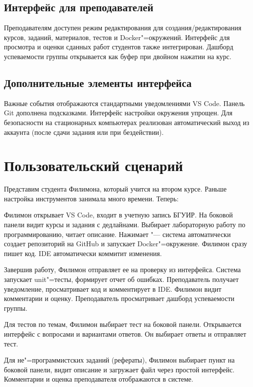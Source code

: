 \documentclass{bsuir}
\begin{document}
\subsection{Интерфейс для преподавателей}
Преподавателям доступен режим редактирования для создания/редактирования курсов,
заданий, материалов, тестов и Docker"=окружений. Интерфейс для просмотра и
оценки сданных работ студентов также интегрирован. Дашборд успеваемости группы
открывается как буфер при двойном нажатии на курс.

\subsection{Дополнительные элементы интерфейса}
Важные события отображаются стандартными уведомлениями VS Code. Панель Git
дополнена подсказками. Интерфейс настройки окружения упрощен. Для безопасности
на стационарных компьютерах реализован автоматический выход из аккаунта (после
сдачи задания или при бездействии).

\section{Пользовательский сценарий}

Представим студента Филимона, который учится на втором курсе. Раньше настройка
инструментов занимала много времени. Теперь:

Филимон открывает VS Code, входит в учетную запись БГУИР. На боковой панели
 видит курсы и задания с дедлайнами. Выбирает
лабораторную работу по программированию, читает описание. Нажимает
 "--- система автоматически создает репозиторий на
GitHub и запускает Docker"=окружение. Филимон сразу пишет код. IDE автоматически
коммитит изменения.

Завершив работу, Филимон отправляет ее на проверку из интерфейса. Система
запускает unit"=тесты, формирует отчет об ошибках. Преподаватель получает
уведомление, просматривает код и комментирует в IDE. Филимон видит комментарии и
оценку. Преподаватель просматривает дашборд успеваемости группы.

Для тестов по темам, Филимон выбирает тест на боковой панели. Открывается
интерфейс с вопросами и вариантами ответов. Он выбирает ответы и отправляет
тест.

Для не"=программистских заданий (рефераты), Филимон выбирает пункт на боковой
панели, видит описание и загружает файл через простой интерфейс. Комментарии и
оценка преподавателя отображаются в системе.
\end{document}
